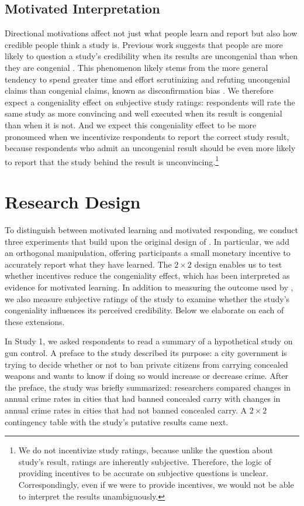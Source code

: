 \documentclass[12pt, letterpaper]{article}
\begin{document}
\subsection*{Motivated Interpretation}
Directional motivations affect not just what people learn and report but also how credible people think a study is. Previous work suggests that people are more likely to question a study's credibility when its results are uncongenial than when they are congenial \citep[e.g.,][]{lord1979, kunda1990, ditto1992}. This phenomenon likely stems from the more general tendency to spend greater time and effort scrutinizing and refuting uncongenial claims than congenial claims, known as disconfirmation bias \citep[e.g.,][]{edwards1996, taber2006}. We therefore expect a congeniality effect on subjective study ratings: respondents will rate the same study as more convincing and well executed when its result is congenial than when it is not. And we expect this congeniality effect to be more pronounced when we incentivize respondents to report the correct study result, because respondents who admit an uncongenial result should be even more likely to report that the study behind the result is unconvincing.\footnote{We do not incentivize study ratings, because unlike the question about study's result, ratings are inherently subjective. Therefore, the logic of providing incentives to be accurate on subjective questions is unclear. Correspondingly, even if we were to provide incentives, we would not be able to interpret the results unambiguously.} 

\section*{Research Design}

To distinguish between motivated learning and motivated responding, we conduct three experiments that build upon the original design of \citet{kahan2017}. In particular, we add an orthogonal manipulation, offering participants a small monetary incentive to accurately report what they have learned. The $2 \times 2$ design enables us to test whether incentives reduce the congeniality effect, which has been interpreted as evidence for motivated learning. In addition to measuring the outcome used by \citeauthor{kahan2017}, we also measure subjective ratings of the study to examine whether the study's congeniality influences its perceived credibility. Below we elaborate on each of these extensions.

In Study 1, we asked respondents to read a summary of a hypothetical study on gun control. A preface to the study described its purpose: a city government is trying to decide whether or not to ban private citizens from carrying concealed weapons and wants to know if doing so would increase or decrease crime. After the preface, the study was briefly summarized: researchers compared changes in annual crime rates in cities that had banned concealed carry with changes in annual crime rates in cities that had not banned concealed carry. A $2 \times 2$ contingency table with the study's putative results came next.
\end{document}
